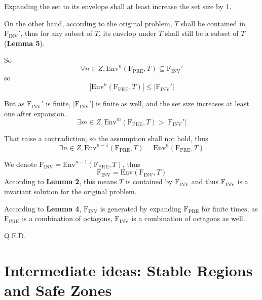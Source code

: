 \documentclass[letterpaper,]{article}
\begin{document}
Expanding the set to its envelope shall at least increase the set size
by 1.

On the other hand, according to the original problem, \(T\) shall be
contained in \(\mathrm{F_{INV}}'\), thus for any subset of \(T\), its
envelop under \(T\) shall still be a subset of \(T\) (\textbf{Lemma 5}).

So
\[\forall n \in Z, \mathrm{Env}^n(\mathrm{F_{PRE}}, T) \subseteq \mathrm{F_{INV}}' \]
so \[|\mathrm{Env}^n(\mathrm{F_{PRE}}, T)| \le |\mathrm{F_{INV}}'|\]

But as \(\mathrm{F_{INV}}'\) is finite, \(|\mathrm{F_{INV}}'|\) is
finite as well, and the set size increases at least one after expansion.
\[\exists m \in Z, \mathrm{Env}^m(\mathrm{F_{PRE}}, T) > |\mathrm{F_{INV}}'|\]

That raise a contradiction, so the assumption shall not hold, thus
\[\exists n \in Z, \mathrm{Env}^{n-1}(\mathrm{F_{PRE}}, T) = \mathrm{Env}^n(\mathrm{F_{PRE}}, T) \]

We denote \(\mathrm{F_{INV}}= \mathrm{Env}^{n-1}(\mathrm{F_{PRE}}, T)\),
thus \[\mathrm{F_{INV}}= \mathrm{Env}(\mathrm{F_{INV}}, T) \] According
to \textbf{Lemma 2}, this means \(T\) is contained by
\(\mathrm{F_{INV}}\) and thus \(\mathrm{F_{INV}}\) is a invariant
solution for the original problem.

According to \textbf{Lemma 4}, \(\mathrm{F_{INV}}\) is generated by
expanding \(\mathrm{F_{PRE}}\) for finite times, as \(\mathrm{F_{PRE}}\)
is a combination of octagons, \(\mathrm{F_{INV}}\) is a combination of
octagons as well.

Q.E.D.

\hypertarget{intermediate-ideas-stable-regions-and-safe-zones}{%
\section{Intermediate ideas: Stable Regions and Safe
Zones}\label{intermediate-ideas-stable-regions-and-safe-zones}}
\end{document}
